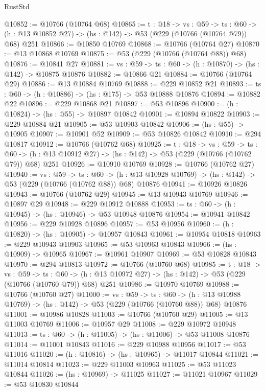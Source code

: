 \begin{lexlean}{RustStd}
\begin{coremodule}
@10852 := @10766 (@10764 @68)
@10865 := {t : @18} ->
  {vs : @59} ->
  {ts : @60} -> (h : @13 @10852 @27) -> (hs : @142) -> @53 (@229 (@10766 (@10764 @79)) @68) @251
@10866 := @10850 @10769
@10868 := @10766 (@10764 @27)
@10870 := @13 @10868 @10769
@10875 := @53 (@229 (@10766 (@10764 @88)) @68)
@10876 := @10841 @27
@10881 := {vs : @59} -> {ts : @60} -> (h : @10870) -> (hs : @142) -> @10875 @10876
@10882 := @10866 @21
@10884 := @10766 (@10764 @29)
@10886 := @13 @10884 @10769
@10888 := @229 @10852 @21
@10893 := {ts : @60} -> (h : @10886) -> (hs : @175) -> @53 @10888 @10876
@10894 := @10882 @22
@10896 := @229 @10868 @21
@10897 := @53 @10896
@10900 := (h : @10824) -> (hs : @55) -> @10897 @10842
@10901 := @10894 @10822
@10903 := @229 @10884 @21
@10905 := @53 @10903 @10842
@10906 := (hs : @55) -> @10905
@10907 := @10901 @52
@10909 := @53 @10826 @10842
@10910 := @294 @10817
@10912 := @10766 (@10762 @68)
@10925 := {t : @18} ->
  {vs : @59} ->
  {ts : @60} -> (h : @13 @10912 @27) -> (hs : @142) -> @53 (@229 (@10766 (@10762 @79)) @68) @251
@10926 := @10910 @10769
@10928 := @10766 (@10762 @27)
@10940 := {vs : @59} ->
  {ts : @60} ->
  (h : @13 @10928 @10769) -> (hs : @142) -> @53 (@229 (@10766 (@10762 @88)) @68) @10876
@10941 := @10926 @10826
@10943 := @10766 (@10762 @29)
@10945 := @13 @10943 @10769
@10946 := @10897 @29
@10948 := @229 @10912 @10888
@10953 := {ts : @60} -> (h : @10945) -> (hs : @10946) -> @53 @10948 @10876
@10954 := @10941 @10842
@10956 := @229 @10928 @10896
@10957 := @53 @10956
@10960 := (h : @10820) -> (hs : @10905) -> @10957 @10843
@10961 := @10954 @10818
@10963 := @229 @10943 @10903
@10965 := @53 @10963 @10843
@10966 := (hs : @10909) -> @10965
@10967 := @10961 @10907
@10969 := @53 @10828 @10843
@10970 := @294 @10813
@10972 := @10766 (@10760 @68)
@10985 := {t : @18} ->
  {vs : @59} ->
  {ts : @60} -> (h : @13 @10972 @27) -> (hs : @142) -> @53 (@229 (@10766 (@10760 @79)) @68) @251
@10986 := @10970 @10769
@10988 := @10766 (@10760 @27)
@11000 := {vs : @59} ->
  {ts : @60} ->
  (h : @13 @10988 @10769) -> (hs : @142) -> @53 (@229 (@10766 (@10760 @88)) @68) @10876
@11001 := @10986 @10828
@11003 := @10766 (@10760 @29)
@11005 := @13 @11003 @10769
@11006 := @10957 @29
@11008 := @229 @10972 @10948
@11013 := {ts : @60} -> (h : @11005) -> (hs : @11006) -> @53 @11008 @10876
@11014 := @11001 @10843
@11016 := @229 @10988 @10956
@11017 := @53 @11016
@11020 := (h : @10816) -> (hs : @10965) -> @11017 @10844
@11021 := @11014 @10814
@11023 := @229 @11003 @10963
@11025 := @53 @11023 @10844
@11026 := (hs : @10969) -> @11025
@11027 := @11021 @10967
@11029 := @53 @10830 @10844

\end{coremodule}
\end{lexlean}
